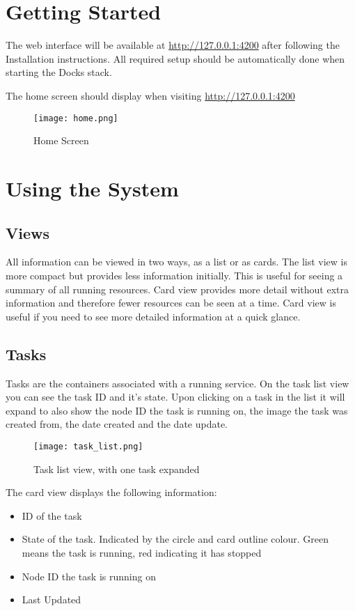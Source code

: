 \documentclass[]{article}
\providecommand{\tightlist}{%
	\setlength{\itemsep}{0pt}\setlength{\parskip}{0pt}}
\begin{document}
\section{Getting Started}
The web interface will be available at \url{http://127.0.0.1:4200} after following the Installation instructions.
All required setup should be automatically done when starting the Docks stack.

The home screen should display when visiting \url{http://127.0.0.1:4200}

\begin{figure}[H]
	\centering
	\texttt{[image: home.png]}
	\caption{Home Screen}
\end{figure}

\section{Using the System}

\subsection{Views}
All information can be viewed in two ways, as a list or as cards. The list view is more compact but provides less
information initially. This is useful for seeing a summary of all running resources. Card view provides more detail
without extra information and therefore fewer resources can be seen at a time. Card view is useful if you
need to see more detailed information at a quick glance.

\subsection{Tasks}
Tasks are the containers associated with a running service. On the task list view you can see the task ID and it's state. Upon clicking on a task in the list it will expand to also show the node ID the task is running on, the image the task was created from, the date created and the date update.

\begin{figure}[H]
	\centering
	\texttt{[image: task\_list.png]}
	\caption{Task list view, with one task expanded}
\end{figure}

The card view displays the following information:
\begin{itemize}
	\tightlist
	\item ID of the task
	\item State of the task. Indicated by the circle and card outline colour. Green means the task is running, red indicating it has stopped
	\item Node ID the task is running on
	\item Last Updated
\end{itemize}
\end{document}
